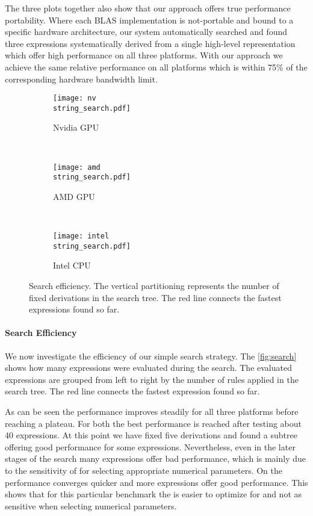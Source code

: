 The three plots together also show that our approach offers true performance portability.
Where each BLAS implementation is not-portable and bound to a specific hardware architecture, our system automatically searched and found three expressions systematically derived from a single high-level representation which offer high performance on all three platforms.
With our approach we achieve the same relative performance on all platforms which is within 75\% of the corresponding hardware bandwidth limit.

\begin{figure*}[p]
%
\centering
\begin{subfigure}[b]{0.65\linewidth}
\texttt{[image: nv\\string\_search.pdf]}
\caption{Nvidia GPU}
\label{fig:search:nv}
\end{subfigure}
\\
%
\begin{subfigure}[b]{0.65\linewidth}
\texttt{[image: amd\\string\_search.pdf]}
\caption{AMD GPU}
\label{fig:search:amd}
\end{subfigure}
\\
%
\begin{subfigure}[b]{0.65\linewidth}
\texttt{[image: intel\\string\_search.pdf]}
\caption{Intel CPU}
\label{fig:search:intel}
\end{subfigure}

\caption[Search efficiency of our prototype search tool]{
   Search efficiency.
   The vertical partitioning represents the number of fixed derivations in the search tree.
   The red line connects the fastest expressions found so far.
}
\label{fig:search}
\end{figure*}


\paragraph{Search Efficiency}
We now investigate the efficiency of our simple search strategy.
The \autoref{fig:search} shows how many expressions were evaluated during the search.
The evaluated expressions are grouped from left to right by the number of rules applied in the search tree.
The red line connects the fastest expression found so far.

As can be seen the performance improves steadily for all three platforms before reaching a plateau.
For both \GPUs the best performance is reached after testing about 40 expressions.
At this point we have fixed five derivations and found a subtree offering good performance for some expressions.
Nevertheless, even in the later stages of the search many expressions offer bad performance, which is mainly due to the sensitivity of \GPU for selecting appropriate numerical parameters.
On the \CPU performance converges quicker and more expressions offer good performance.
This shows that for this particular benchmark the \CPU is easier to optimize for and not as sensitive when selecting numerical parameters.

